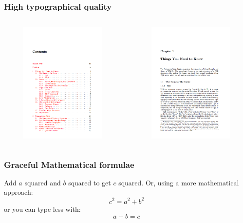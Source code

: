 \documentclass[notheorems,serif,table,compress]{beamer}  %
\begin{document}
%
\begin{frame}[fragile]
\frametitle{High typographical quality}
\begin{columns}[c]
\begin{figure}
\includegraphics[width=5.1cm]{document1}
\end{figure}

\begin{figure}
\includegraphics[width=5.1cm]{document2}
\end{figure}
\end{columns}

\end{frame}

%
\begin{frame}
\frametitle{Graceful Mathematical formulae}
\begin{tcolorbox}[colback=blue!5,colframe=blue!75!black] 
Add $a$ squared and $b$ squared to get $c$ squared. Or, using
a more mathematical approach:
\begin{displaymath}
c^{2}=a^{2}+b^{2}
\end{displaymath}
or you can type less with:
\[a+b=c\]
\end{tcolorbox}  

\end{frame}
\end{document}
